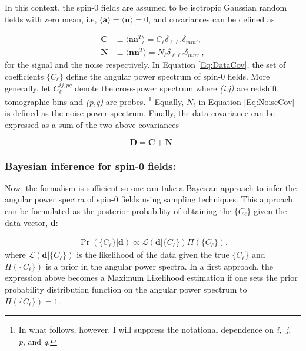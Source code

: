 \qquad In this context, the spin-0 fields are assumed to be isotropic Gaussian random fields with zero mean, i.e, $\langle \textbf{a} \rangle = \langle \textbf{n} \rangle = 0$, and covariances can be defined as

\begin{align}
\label{Eq:DataCov} \mathbf{C} & \equiv \langle \textbf{a} \textbf{a}^T \rangle = C_{\ell}\delta_{\ell \ell'}\delta_{m m'}, \\ 
\label{Eq:NoiseCov} \mathbf{N} & \equiv \langle \textbf{n} \textbf{n}^T \rangle = N_{\ell}\delta_{\ell \ell'}\delta_{m m'} \, , 
\end{align}
\noindent for the signal and the noise respectively. In Equation \eqref{Eq:DataCov}, the set of coefficients $\{C_{\ell}\}$ define the angular power spectrum of spin-0 fields. More generally, let $C_{\ell}^{ij, pq}$ denote the cross-power spectrum where \textit{(i,j)} are redshift tomographic bins and \textit{(p,q)} are probes. \footnote{In what follows, however, I will suppress the notational dependence on \textit{i,\, j,\, p}, and \textit{q}.} Equally, $N_{\ell}$ in Equation \eqref{Eq:NoiseCov} is defined as the noise power spectrum. Finally, the data covariance can be expressed as a sum of the two above covariances

\begin{equation}
\textbf{D} = \textbf{C} + \textbf{N} \, .
\end{equation}

\subsubsection{Bayesian inference for spin-0 fields:}
\qquad Now, the formalism is sufficient so one can take a Bayesian approach to infer the angular power spectra of spin-0 fields using sampling techniques. This approach can be formulated as the posterior probability of obtaining the $\{C_{\ell}\}$ given the data vector, $\mathbf{d}$:

\begin{align}
\Pr (\{C_{\ell}\}|\mathbf{d}) \propto \mathcal{L} (\mathbf{d}|\{C_{\ell}\})\Pi(\{C_{\ell}\}).
\label{Eq:LikelFirstExpression}
\end{align}
\noindent where $\mathcal{L} (\mathbf{d}|\{C_{\ell}\})$ is the likelihood of the data given the true $\{C_{\ell}\}$ and $\Pi(\{C_{\ell}\})$ is a prior in the angular power spectra. In a first approach, the expression above becomes a Maximum Likelihood estimation \citep{1994Gorsky,1997Tegmark,Hobson2002,Efstat2004} if one sets the prior probability distribution function on the angular power spectrum to $\Pi(\{C_{\ell}\}) = 1$. 

